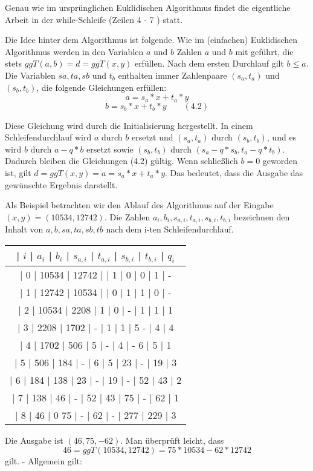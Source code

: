 \documentclass[a4paper]{article}
\begin{document}
\begin{multicols}{3}
    Genau wie im ursprünglichen Euklidischen Algorithmus findet die eigentliche Arbeit in der while-Schleife (Zeilen 4 - 7 ) statt.

    Die Idee hinter dem Algorithmus ist folgende. Wie im (einfachen) Euklidischen Algorithmus werden in den Variablen $a$ und $b$ Zahlen $a$ und $b$ mit geführt, die stets $ggT(a,b) =d= ggT(x,y)$ erfüllen. Nach dem ersten Durchlauf gilt $b\leq a$. Die Variablen $sa,ta,sb$ und $t_b$ enthalten immer Zahlenpaare $(s_a,t_a)$ und $(s_b,t_b)$, die folgende Gleichungen erfüllen:
    $$a=s_a*x+t_a*y$$
    $$b=s_b*x+t_b*y \quad\quad(4.2)$$

    Diese Gleichung wird durch die Initialisierung hergestellt. In einem Schleifendurchlauf wird $a$ durch $b$ ersetzt und $(s_a,t_a)$ durch $(s_b,t_b)$, und es wird $b$ durch $a-q*b$ ersetzt sowie $(s_b,t_b)$ durch $(s_a-q*s_b, t_a-q*t_b)$. Dadurch bleiben die Gleichungen (4.2) gültig. Wenn schließlich $b=0$ geworden ist, gilt $d=ggT(x,y) =a=s_a*x+t_a*y$. Das bedeutet, dass die Ausgabe das gewünschte Ergebnis darstellt.

    Als Beispiel betrachten wir den Ablauf des Algorithmus auf der Eingabe $(x,y) =(10534,12742)$. Die Zahlen $a_i,b_i,s_{a,i},t_{a,i},s_{b,i},t_{b,i}$ bezeichnen den Inhalt von $a,b,sa,ta,sb,tb$ nach dem i-ten Schleifendurchlauf.
    \begin{tabular}{c}
    | $i$ | $a_i$ | $b_i$ | $s_{a,i}$ | $t_{a,i}$ | $s_{b,i}$ | $t_{b,i}$ | $q_i$ \\\hline
    | 0  | 10534 | 12742 |      | 1     | 0     | 0     | 1   | - \\
    | 1  | 12742 | 10534 |      | 0     | 1     | 1     | 0   | - \\
    | 2  | 10534 | 2208 | 1     | 0     | -     | 1     | 1   | 1 \\
    | 3  | 2208 | 1702 | -     | 1     | 1     | 5 -    | 4   | 4 \\
    | 4  | 1702 | 506  | 5     | -     | 4     | - 6    | 5   | 1 \\
    | 5  | 506  | 184  | -     | 6     | 5     | 23    | -   | 19 | 3 \\
    | 6  | 184  | 138  | 23    | -     | 19    | -     | 52  | 43 | 2 \\
    | 7  | 138  | 46  | -     | 52    | 43    | 75    | -   | 62 | 1 \\
    | 8  | 46  | 0 75 | -     | 62    | -     | 277    | 229  | 3 
    \end{tabular}

    Die Ausgabe ist $(46, 75 ,-62)$. Man überprüft leicht, dass
    $$46 = ggT(10534,12742) = 75* 10534 - 62 * 12742$$
    gilt. - Allgemein gilt:


\end{multicols}
\end{document}
